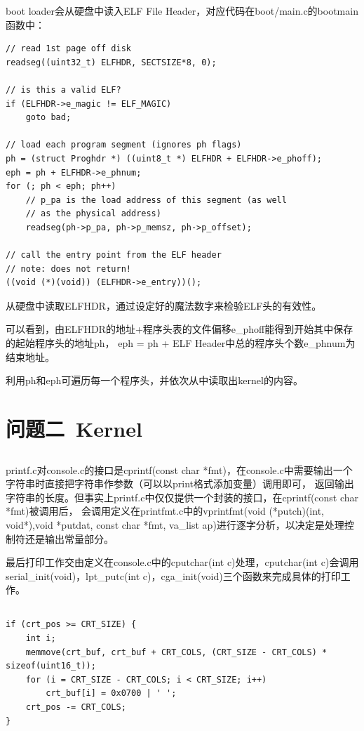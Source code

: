 \documentclass[12pt,a4paper,UTF8]{article}
\begin{document}
	boot loader会从硬盘中读入ELF File Header，对应代码在boot/main.c的bootmain函数中：
	\begin{lstlisting}[style=CPP]
// read 1st page off disk
readseg((uint32_t) ELFHDR, SECTSIZE*8, 0);

// is this a valid ELF?
if (ELFHDR->e_magic != ELF_MAGIC)
	goto bad;

// load each program segment (ignores ph flags)
ph = (struct Proghdr *) ((uint8_t *) ELFHDR + ELFHDR->e_phoff);
eph = ph + ELFHDR->e_phnum;
for (; ph < eph; ph++)
	// p_pa is the load address of this segment (as well
	// as the physical address)
	readseg(ph->p_pa, ph->p_memsz, ph->p_offset);

// call the entry point from the ELF header
// note: does not return!
((void (*)(void)) (ELFHDR->e_entry))();
	\end{lstlisting}

	从硬盘中读取ELFHDR，通过设定好的魔法数字来检验ELF头的有效性。

	可以看到，由ELFHDR的地址+程序头表的文件偏移e\_phoff能得到开始其中保存的起始程序头的地址ph，
	eph = ph + ELF Header中总的程序头个数e\_phnum为结束地址。

	利用ph和eph可遍历每一个程序头，并依次从中读取出kernel的内容。


\section{问题二\ Kernel}

	\subsection{}
	printf.c对console.c的接口是cprintf(const char *fmt)，在console.c中需要输出一个字符串时直接把字符串作参数（可以以print格式添加变量）调用即可，
	返回输出字符串的长度。但事实上printf.c中仅仅提供一个封装的接口，在cprintf(const char *fmt)被调用后，
	会调用定义在printfmt.c中的vprintfmt(void (*putch)(int, void*),void *putdat, const char *fmt, va\_list ap)进行逐字分析，以决定是处理控制符还是输出常量部分。

	最后打印工作交由定义在console.c中的cputchar(int c)处理，cputchar(int c)会调用serial\_init(void)，lpt\_putc(int c)，cga\_init(void)三个函数来完成具体的打印工作。

	\subsection{}
	\begin{lstlisting}[style=CPP]
if (crt_pos >= CRT_SIZE) {
	int i;
	memmove(crt_buf, crt_buf + CRT_COLS, (CRT_SIZE - CRT_COLS) * sizeof(uint16_t));
	for (i = CRT_SIZE - CRT_COLS; i < CRT_SIZE; i++)
		crt_buf[i] = 0x0700 | ' ';
	crt_pos -= CRT_COLS;
}
	\end{lstlisting}
\end{document}
